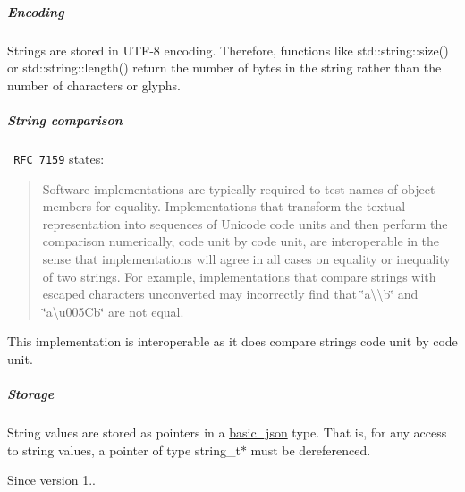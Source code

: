 \subparagraph*{Encoding}

Strings are stored in U\+T\+F-\/8 encoding. Therefore, functions like {\ttfamily std\+::string\+::size()} or {\ttfamily std\+::string\+::length()} return the number of bytes in the string rather than the number of characters or glyphs.

\subparagraph*{String comparison}

\href{http://rfc7159.net/rfc7159}{\texttt{ R\+FC 7159}} states\+: \begin{quote}
Software implementations are typically required to test names of object members for equality. Implementations that transform the textual representation into sequences of Unicode code units and then perform the comparison numerically, code unit by code unit, are interoperable in the sense that implementations will agree in all cases on equality or inequality of two strings. For example, implementations that compare strings with escaped characters unconverted may incorrectly find that {\ttfamily \char`\"{}a\textbackslash{}\textbackslash{}b\char`\"{}} and {\ttfamily \char`\"{}a\textbackslash{}u005\+Cb\char`\"{}} are not equal. \end{quote}


This implementation is interoperable as it does compare strings code unit by code unit.

\subparagraph*{Storage}

String values are stored as pointers in a \mbox{\hyperlink{classnlohmann_1_1basic__json}{basic\+\_\+json}} type. That is, for any access to string values, a pointer of type {\ttfamily string\+\_\+t$\ast$} must be dereferenced.

\begin{DoxySince}{Since}
version 1.. 
\end{DoxySince}
\mbox{\label{classnlohmann_1_1basic__json_ae8cbef097f7da18a781fc86587de6b90}} 
